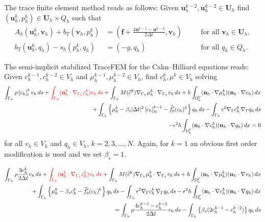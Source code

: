 \documentclass{article}
\newcommand{\blf}{\mathbf f}
\newcommand{\bn}{\mathbf n}
\newcommand{\bu}{\mathbf u}
\newcommand{\bU}{\mathbf U}
\newcommand{\bv}{\mathbf v}
\newcommand{\gradG}{\nabla_{\Gamma}}
\newcommand{\OGamma}{\Omega^\Gamma_h}
\begin{document}
The trace finite element method reads as follows:
Given $ \bu_h^{k-2}, \bu_h^{k-2} \in \bU_h$ find $(\bu_h^k, p_h^k) \in \bU_h \times Q_h$ such that
\begin{equation} \label{discrete}
\begin{aligned}
A_h(\bu_h^k,\bv_h) + b_T(\bv_h,p_h^k) & =(\blf+\frac{4\bu^{k-1}-\bu^{k-2}}{2\Delta t},\bv_h) &\quad &\text{for all } \bv_h \in \bU_h, \\
b_T(\bu_h^k,q_h)-s_h(p_h^k,q_h) & = (-g,q_h) &\quad &\text{for all }q_h \in Q_h.
\end{aligned}
\end{equation}

The semi-implicit stabilized TraceFEM for the Cahn--Hilliard equations
reads: Given $c^{k-1}_h,c^{k-2}_h\in V_h$ and $\mu^{k-1}_h,\mu^{k-2}_h\in V_h$,  find $c_h^k, \mu^k \in V_h$ solving
\begin{equation}\label{eq:CH_FE}
\begin{split}
\int_{\Gamma_h} \rho \left[c_h\right]_t^{k}v_h\,ds    + {\color{red}  \int_{\Gamma_h} (\bu_h^k\cdot\nabla_{\Gamma_h}c_h^k )v_h\,ds }+ \int_{\Gamma_h} M(\widetilde c^k) \nabla_{\Gamma_h}\mu_h^k\cdot\nabla_{\Gamma_h}v_h\,ds +  h \int_{\OGamma} (\bn_h\cdot\nabla \mu_h^k) (\bn_h\cdot\nabla v_h) \, dx\\
%
+\int_{\Gamma_h}\left\{  \mu_h^k - \beta_s|\Delta t|^2\left[{c}_h\right]_{tt}^{k-1} - \widetilde  f'_0( c_h)^{k}\right\}q_h\,ds
- \int_{\Gamma_h} \epsilon^2 \gradG c_h^k \, \gradG q_h \, ds \\ -\epsilon^2 h \int_{\OGamma} ( \bn_h\cdot\nabla c_h^k) (\bn_h\cdot\nabla q_h) \, dx = 0
\end{split}
\end{equation}
for all  $v_h\in V_h$ and $q_h \in V_h$, $k=2,3,\dots,N$. Again, for $k=1$ an obvious first order modification is used and we set $\beta_s=1$.

\begin{equation}\label{eq:CH_FE}
\begin{split}
\int_{\Gamma_h} \rho \frac{3c_h^k}{2\Delta t}v_h\,ds    + {\color{red}  \int_{\Gamma_h} (\bu_h^k\cdot\nabla_{\Gamma_h}c_h^k )v_h\,ds }+ \int_{\Gamma_h} M(\widetilde c^k) \nabla_{\Gamma_h}\mu_h^k\cdot\nabla_{\Gamma_h}v_h\,ds +  h \int_{\OGamma} (\bn_h\cdot\nabla \mu_h^k) (\bn_h\cdot\nabla v_h) \, dx\\
%
+\int_{\Gamma_h}\left\{  \mu_h^k - \beta_s c_h^k - \widetilde  f'_0( c_h)^{k}\right\}q_h\,ds
- \int_{\Gamma_h} \epsilon^2 \gradG c_h^k \, \gradG q_h \, ds  -\epsilon^2 h \int_{\OGamma} ( \bn_h\cdot\nabla c_h^k) (\bn_h\cdot\nabla q_h) \, dx \\= \int_{\Gamma_h} \rho \frac{4c_h^{k-1}-c_h^{k-2}}{2\Delta t}v_h\,ds - \int_{\Gamma_h}\left\{\beta_s(2c_h^{k-1}-c_h^{k-2})\right\}q_h\,ds
\end{split}
\end{equation}
\end{document}
